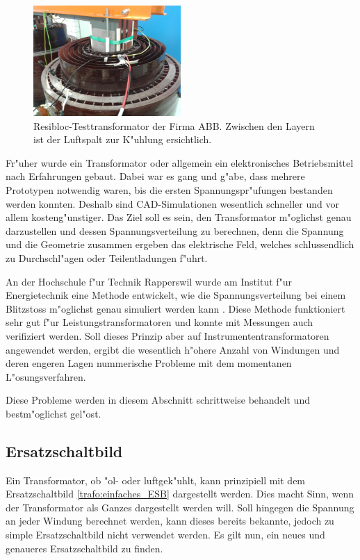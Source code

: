 \begin{refsection}
\begin{figure}
	\centering
	\includegraphics[width=0.5\textwidth]{./Trafo/images/resibloc.jpg}
	\caption{Resibloc-Testtransformator der Firma ABB. Zwischen den Layern ist der Luftspalt zur K"uhlung ersichtlich.}
	\label{trafo:resibloc}
\end{figure}
Fr"uher wurde ein Transformator oder allgemein ein elektronisches Betriebsmittel nach Erfahrungen gebaut. Dabei war es gang und g"abe, dass mehrere Prototypen notwendig waren, bis die ersten Spannungspr"ufungen bestanden werden konnten. Deshalb sind CAD-Simulationen wesentlich schneller und vor allem kosteng"unstiger. Das Ziel soll es sein, den Transformator m"oglichst genau darzustellen und dessen Spannungsverteilung zu berechnen, denn die Spannung und die Geometrie zusammen ergeben das elektrische Feld, welches schlussendlich zu Durchschl"agen oder Teilentladungen f"uhrt.

An der Hochschule f"ur Technik Rapperswil wurde am Institut f"ur Energietechnik eine Methode entwickelt, wie die Spannungsverteilung bei einem Blitzstoss m"oglichst genau simuliert werden kann \cite{trafo:BILImpulse}. Diese Methode funktioniert sehr gut f"ur Leistungstransformatoren und konnte mit Messungen auch verifiziert werden. 
Soll dieses Prinzip aber auf Instrumententransformatoren angewendet werden, ergibt die wesentlich h"ohere Anzahl von Windungen und deren engeren Lagen nummerische Probleme mit dem momentanen L"osungsverfahren. 

Diese Probleme werden in diesem Abschnitt schrittweise behandelt und bestm"oglichst gel"ost. 


\subsection{Ersatzschaltbild}
Ein Transformator, ob "ol- oder luftgek"uhlt, kann prinzipiell mit dem Ersatzschaltbild \ref{trafo:einfaches_ESB} dargestellt werden. Dies macht Sinn, wenn der Transformator als Ganzes dargestellt werden will. Soll hingegen die Spannung an jeder Windung berechnet werden, kann dieses bereits bekannte, jedoch zu simple Ersatzschaltbild nicht verwendet werden. Es gilt nun, ein neues und genaueres Ersatzschaltbild zu finden. 


\end{refsection}
